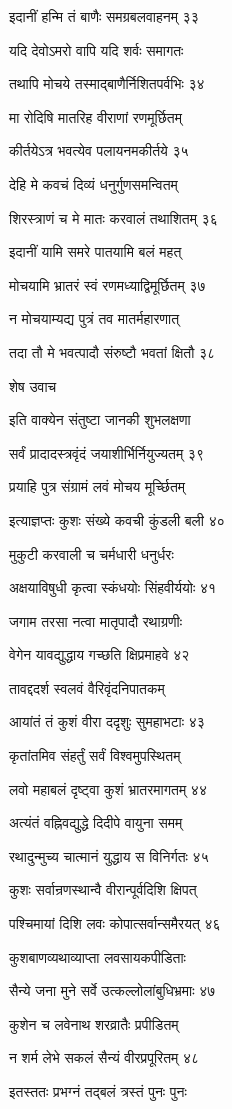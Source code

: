 इदानीं हन्मि तं बाणैः समग्रबलवाहनम् ३३

यदि देवोऽमरो वापि यदि शर्वः समागतः

तथापि मोचये तस्माद्बाणैर्निशितपर्वभिः ३४

मा रोदिषि मातरिह वीराणां रणमूर्छितम्

कीर्तयेऽत्र भवत्येव पलायनमकीर्तये ३५

देहि मे कवचं दिव्यं धनुर्गुणसमन्वितम्

शिरस्त्राणं च मे मातः करवालं तथाशितम् ३६

इदानीं यामि समरे पातयामि बलं महत्

मोचयामि भ्रातरं स्वं रणमध्याद्विमूर्छितम् ३७

न मोचयाम्यद्य पुत्रं तव मातर्महारणात्

तदा तौ मे भवत्पादौ संरुष्टौ भवतां क्षितौ ३८

शेष उवाच

इति वाक्येन संतुष्टा जानकी शुभलक्षणा

सर्वं प्रादादस्त्रवृंदं जयाशीर्भिर्नियुज्यतम् ३९

प्रयाहि पुत्र संग्रामं लवं मोचय मूर्च्छितम्

इत्याज्ञप्तः कुशः संख्ये कवची कुंडली बली ४०

मुकुटी करवाली च चर्मधारी धनुर्धरः

अक्षयाविषुधी कृत्वा स्कंधयोः सिंहवीर्ययोः ४१

जगाम तरसा नत्वा मातृपादौ रथाग्रणीः

वेगेन यावद्युद्धाय गच्छति क्षिप्रमाहवे ४२

तावद्ददर्श स्वलवं वैरिवृंदनिपातकम्

आयांतं तं कुशं वीरा ददृशुः सुमहाभटाः ४३

कृतांतमिव संहर्तुं सर्वं विश्वमुपस्थितम्

लवो महाबलं दृष्ट्वा कुशं भ्रातरमागतम् ४४

अत्यंतं वह्निवद्युद्धे दिदीपे वायुना समम्

रथादुन्मुच्य चात्मानं युद्धाय स विनिर्गतः ४५

कुशः सर्वान्रणस्थान्वै वीरान्पूर्वदिशि क्षिपत्

पश्चिमायां दिशि लवः कोपात्सर्वान्समैरयत् ४६

कुशबाणव्यथाव्याप्ता लवसायकपीडिताः

सैन्ये जना मुने सर्वे उत्कल्लोलांबुधिभ्रमाः ४७

कुशेन च लवेनाथ शरव्रातैः प्रपीडितम्

न शर्म लेभे सकलं सैन्यं वीरप्रपूरितम् ४८

इतस्ततः प्रभग्नं तद्बलं त्रस्तं पुनः पुनः

